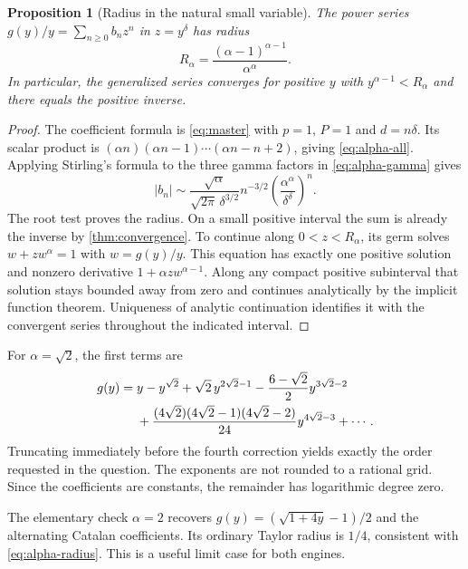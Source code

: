 \documentclass[11pt,a4paper]{article}
\numberwithin{equation}{section}
\newtheorem{proposition}[theorem]{Proposition}
\theoremstyle{definition}
\begin{document}
\begin{proposition}[Radius in the natural small variable]
\label{prop:alpha-radius}
The power series $g(y)/y=\sum_{n\ge0}b_n z^n$ in
$z=y^\delta$ has radius
\begin{equation}\label{eq:alpha-radius}
 R_\alpha=\frac{(\alpha-1)^{\alpha-1}}{\alpha^\alpha}.
\end{equation}
In particular, the generalized series converges for positive $y$ with
$y^{\alpha-1}<R_\alpha$ and there equals the positive inverse.
\end{proposition}
\begin{proof}
The coefficient formula is \eqref{eq:master} with $p=1$, $P=1$ and
$d=n\delta$. Its scalar product is
$(\alpha n)(\alpha n-1)\cdots(\alpha n-n+2)$, giving
\eqref{eq:alpha-all}. Applying Stirling's formula \cite{stirling} to the three gamma
factors in \eqref{eq:alpha-gamma} gives
\[
 |b_n|\sim\frac{\sqrt\alpha}{\sqrt{2\pi}\,\delta^{3/2}}
 n^{-3/2}\left(\frac{\alpha^\alpha}{\delta^\delta}\right)^n.
\]
The root test proves the radius. On a small positive interval the sum is
already the inverse by \cref{thm:convergence}. To continue along
$0<z<R_\alpha$, its germ solves $w+zw^\alpha=1$ with $w=g(y)/y$.
This equation has exactly one positive solution and nonzero derivative
$1+\alpha z w^{\alpha-1}$. Along any compact positive subinterval that
solution stays bounded away from zero and continues analytically by the
implicit function theorem. Uniqueness of analytic continuation identifies
it with the convergent series throughout the indicated interval.
\end{proof}

For $\alpha=\sqrt2$, the first terms are
\begin{align}
 g(y)={}&y-y^{\sqrt2}+\sqrt2\,y^{2\sqrt2-1}
 -\frac{6-\sqrt2}{2}y^{3\sqrt2-2}\notag\\
 &+\frac{(4\sqrt2)(4\sqrt2-1)(4\sqrt2-2)}{24}
      y^{4\sqrt2-3}+\cdots.
 \label{eq:sqrt2-five}
\end{align}
Truncating immediately before the fourth correction yields exactly the
order requested in the question. The exponents are not rounded to a
rational grid. Since the coefficients are constants, the remainder has
logarithmic degree zero.

The elementary check $\alpha=2$ recovers
$g(y)=(\sqrt{1+4y}-1)/2$ and the alternating Catalan coefficients.
Its ordinary Taylor radius is $1/4$, consistent with
\eqref{eq:alpha-radius}. This is a useful limit case for both engines.
\end{document}

